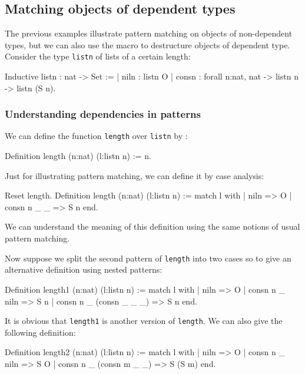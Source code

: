 \subsection{Matching objects of dependent types}
The previous examples illustrate pattern matching on objects of
non-dependent types, but we can also 
use the macro to destructure objects of dependent type.
Consider the type \verb+listn+ of lists of a certain length:
\label{listn}

\begin{coq_example}
Inductive listn : nat -> Set :=
  | niln : listn O
  | consn : forall n:nat, nat -> listn n -> listn (S n).
\end{coq_example}

\subsubsection{Understanding dependencies in patterns}
We can define the function \verb+length+ over \verb+listn+ by :

\begin{coq_example}
Definition length (n:nat) (l:listn n) := n.
\end{coq_example}

Just for illustrating pattern matching, 
we can define it by case analysis:
\begin{coq_example}
Reset length.
Definition length (n:nat) (l:listn n) :=
  match l with
  | niln => O
  | consn n _ _ => S n
  end.
\end{coq_example}

We can understand the meaning of this definition using the
same notions of usual pattern matching.

Now suppose we split the second pattern  of \verb+length+ into two 
cases so to give an
alternative definition using nested patterns:
\begin{coq_example}
Definition length1 (n:nat) (l:listn n) :=
  match l with
  | niln => O
  | consn n _ niln => S n
  | consn n _ (consn _ _ _) => S n
  end.
\end{coq_example}

It is obvious that \verb+length1+ is  another version of
\verb+length+. We can also give the following definition:
\begin{coq_example}
Definition length2 (n:nat) (l:listn n) :=
  match l with
  | niln => O
  | consn n _ niln => S O
  | consn n _ (consn m _ _) => S (S m)
  end.
\end{coq_example}

